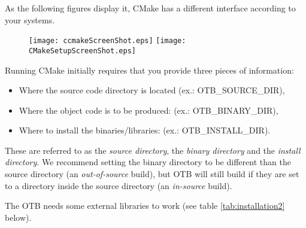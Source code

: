 As the following figures display it, CMake has a different interface according to your systems.
\label{sec:ConfiguringOTBwithVTK}

\begin{figure}[ht]
\centering
\texttt{[image: ccmakeScreenShot.eps]}
\texttt{[image: CMakeSetupScreenShot.eps]}
\label{fig:CMakeGUI}
\end{figure}




Running CMake initially requires that you provide three pieces of
information:
\begin{itemize}
\item Where the source code directory is located (ex.: OTB\_SOURCE\_DIR),
\item Where the object code is to be produced: (ex.: OTB\_BINARY\_DIR),
\item Where to install the binaries/libraries: (ex.: OTB\_INSTALL\_DIR).
\end{itemize}
These are referred to as the \emph{source directory}, the \emph{binary directory} and the \emph{install directory}.
We recommend setting the binary directory to be different than the source directory (an
\emph{out-of-source} build), but OTB will still build if they are set
to a directory inside the source directory (an \emph{in-source} build).


The OTB needs some external libraries to work (see table \ref{tab:installation2} below). 

